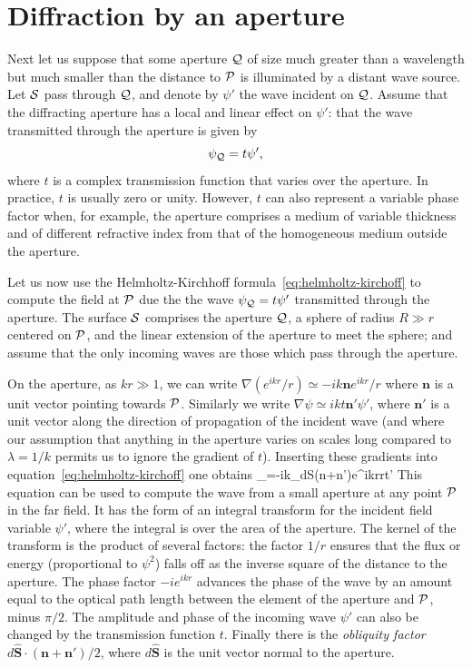 \section{Diffraction by an aperture}

Next let us suppose that some aperture ${\cal Q}$ of size much greater than a wavelength but
much smaller than the distance to ${\cal P}$ is illuminated by a distant wave source. Let 
${\cal S}$ pass through ${\cal Q}$, and denote by $\psi'$ the wave incident on ${\cal Q}$. Assume
that the diffracting aperture has a local and linear effect on $\psi'$: that the wave 
transmitted through the aperture is given by 
\[
\psi_{\cal Q}=t\psi',
\]
where $t$ is a complex transmission function that varies over the aperture. In practice, $t$
is usually zero or unity. However, $t$ can also represent a variable phase factor when, for
example, the aperture comprises a medium of variable thickness and of different refractive
index from that of the homogeneous medium outside the aperture.

Let us now use the Helmholtz-Kirchhoff formula~\ref{eq:helmholtz-kirchoff} to compute the field
at ${\cal P}$ due the the wave $\psi_{\cal Q}=t\psi'$ transmitted through the aperture. The
surface ${\cal S}$ comprises the aperture ${\cal Q}$, a sphere of radius $R\gg r$ centered on 
${\cal P}$, and the linear extension of the aperture to meet the sphere; and assume that the only
incoming waves are those which pass through the aperture. 

On the aperture, as $kr\gg 1$, we can write $\nabla({e^{ikr}/r})\simeq -{ik{\bm n}e^{ikr}/r}$ 
where ${\bm n}$ is a unit vector pointing towards ${\cal P}$. Similarly we write 
$\nabla\psi\simeq ikt{\bm n'}\psi'$, where ${\bm n'}$ is a unit vector along the direction
of propagation of the incident wave (and where our assumption that anything in the aperture
varies on scales long compared to $\lambda={1/k}$ permits us to ignore the gradient of $t$).
Inserting these gradients into equation~\ref{eq:helmholtz-kirchoff} one obtains
\be
\psi_=-{ik\pi}\int_d{\bm S}\cdot\left({{\bm n}+{\bm n'}}\right){e^{ikr}\over r}t\psi'
\label{eq:small-aperture}
\ee
This equation can be used to compute the wave from a small aperture at any point ${\cal P}$ in 
the far field. It has the form of an integral transform for the incident field variable $\psi'$,
where the integral is over the area of the aperture. The kernel of the transform is the 
product of several factors: the factor ${1/r}$ ensures that the flux or energy (proportional
to $\psi^2$) falls off as the inverse square of the distance to the aperture. The phase 
factor $-ie^{ikr}$ advances the phase of the wave by an amount equal to the optical path 
length between the element of the aperture and ${\cal P}$, minus ${\pi/2}$. The amplitude and
phase of the incoming wave $\psi'$ can also be changed by the transmission function $t$.
Finally there is the {\it obliquity factor} ${d\hat{\bm S}\cdot({\bm n}+{\bm n'})/2}$, where 
$d\hat{\bm S}$ is the unit vector normal to the aperture. 

